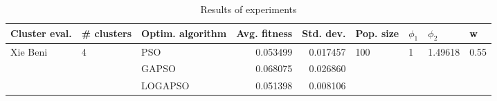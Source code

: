 \begin{table}
\centering
\caption{Results of experiments}
\begin{tabular}{lllrrllll}
\toprule
            Cluster eval. &        \# clusters & Optim. algorithm &  Avg. fitness &  Std. dev. &            Pop. size &         $\phi_{1}$ &               $\phi_{2}$ &                     w \\
\midrule
\multirow{3}{*}{Xie Beni} & \multirow{3}{*}{4} &              PSO &      0.053499 &   0.017457 & \multirow{3}{*}{100} & \multirow{3}{*}{1} & \multirow{3}{*}{1.49618} & \multirow{3}{*}{0.55} \\
                          &                    &            GAPSO &      0.068075 &   0.026860 &                      &                    &                          &                       \\
                          &                    &          LOGAPSO &      0.051398 &   0.008106 &                      &                    &                          &                       \\
\bottomrule
\end{tabular}
\end{table}
